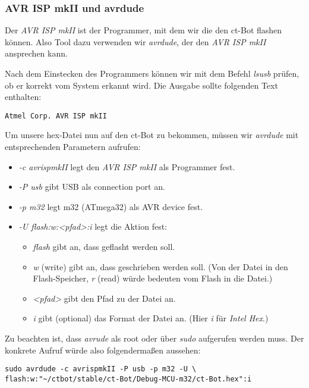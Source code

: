 \subsubsection{AVR ISP mkII und avrdude}
Der \textit{AVR ISP mkII} ist der Programmer, mit dem wir die den ct-Bot flashen können. Also Tool dazu verwenden wir \textit{avrdude}, der den \textit{AVR ISP mkII} ansprechen kann.

Nach dem Einstecken des Programmers können wir mit dem Befehl \textit{lsusb} prüfen, ob er korrekt vom System erkannt wird. Die Ausgabe sollte folgenden Text enthalten:
\begin{lstlisting}
Atmel Corp. AVR ISP mkII
\end{lstlisting}

Um unsere hex-Datei nun auf den ct-Bot zu bekommen, müssen wir \textit{avrdude} mit entsprechenden Parametern aufrufen:
\begin{itemize}
\item \textit{-c avrispmkII} legt den \textit{AVR ISP mkII} als Programmer fest.
\item \textit{-P usb} gibt USB als connection port an.
\item \textit{-p m32} legt m32 (ATmega32) als AVR device fest.
\item \textit{-U flash:w:<pfad>:i} legt die Aktion fest:
	\begin{itemize}
	\item \textit{flash} gibt an, dass geflasht werden soll.
	\item \textit{w} (write) gibt an, dass geschrieben werden soll. (Von der Datei in den Flash-Speicher, \textit{r} (read) würde bedeuten vom Flash in die Datei.)
	\item \textit{<pfad>} gibt den Pfad zu der Datei an.
	\item \textit{i} gibt (optional) das Format der Datei an. (Hier \textit{i} für \textit{Intel Hex}.)
	\end{itemize}
\end{itemize}
Zu beachten ist, dass \textit{avrude} als root oder über \textit{sudo} aufgerufen werden muss.
Der konkrete Aufruf würde also folgendermaßen aussehen:
\begin{lstlisting}
sudo avrdude -c avrispmkII -P usb -p m32 -U \
flash:w:"~/ctbot/stable/ct-Bot/Debug-MCU-m32/ct-Bot.hex":i
\end{lstlisting}
